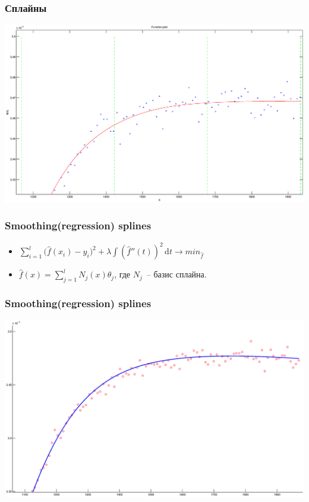 \documentclass[smaller]{beamer}
\begin{document}
\begin{frame}
  \frametitle{Сплайны}
\includegraphics[scale=0.2]{spline_b.eps}
\end{frame}

\begin{frame}
  \frametitle{Smoothing(regression) splines}
  \begin{itemize}
    \item  $\displaystyle \sum_{i=1}^l \bigl(\hat{f}(x_i)-y_i\bigr)^2 + \lambda \int \! (\hat{f}''(t))^2 \, \mathrm{d}t \rightarrow min_{\hat{f}}$
    \item $\displaystyle \hat{f}(x) = \sum_{j=1}^lN_j(x)\theta_j$, где $N_j$~-- базис сплайна.
 \end{itemize}
\end{frame}

\begin{frame}
  \frametitle{Smoothing(regression) splines}
  \includegraphics[scale=0.2]{smoothing_splines.eps}
\end{frame}
\end{document}
